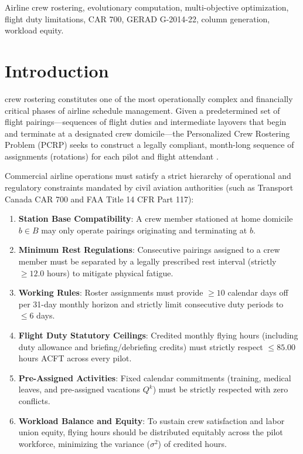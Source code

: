 \documentclass[journal]{IEEEtran}
\begin{document}
\begin{IEEEkeywords}
Airline crew rostering, evolutionary computation, multi-objective optimization, flight duty limitations, CAR 700, GERAD G-2014-22, column generation, workload equity.
\end{IEEEkeywords}

\section{Introduction}

 crew rostering constitutes one of the most operationally complex and financially critical phases of airline schedule management. Given a predetermined set of flight pairings---sequences of flight duties and intermediate layovers that begin and terminate at a designated crew domicile---the Personalized Crew Rostering Problem (PCRP) seeks to construct a legally compliant, month-long sequence of assignments (rotations) for each pilot and flight attendant \cite{kasirzadeh2017,kohl2004}. 

Commercial airline operations must satisfy a strict hierarchy of operational and regulatory constraints mandated by civil aviation authorities (such as Transport Canada CAR 700 and FAA Title 14 CFR Part 117):
\begin{enumerate}
    \item \textbf{Station Base Compatibility}: A crew member stationed at home domicile $b \in B$ may only operate pairings originating and terminating at $b$.
    \item \textbf{Minimum Rest Regulations}: Consecutive pairings assigned to a crew member must be separated by a legally prescribed rest interval (strictly $\ge 12.0$ hours) to mitigate physical fatigue.
    \item \textbf{Working Rules}: Roster assignments must provide $\ge 10$ calendar days off per 31-day monthly horizon and strictly limit consecutive duty periods to $\le 6$ days.
    \item \textbf{Flight Duty Statutory Ceilings}: Credited monthly flying hours (including duty allowance and briefing/debriefing credits) must strictly respect $\le 85.00$ hours ACFT across every pilot.
    \item \textbf{Pre-Assigned Activities}: Fixed calendar commitments (training, medical leaves, and pre-assigned vacations $Q^k$) must be strictly respected with zero conflicts.
    \item \textbf{Workload Balance and Equity}: To sustain crew satisfaction and labor union equity, flying hours should be distributed equitably across the pilot workforce, minimizing the variance ($\sigma^2$) of credited hours.
\end{enumerate}
\end{document}
